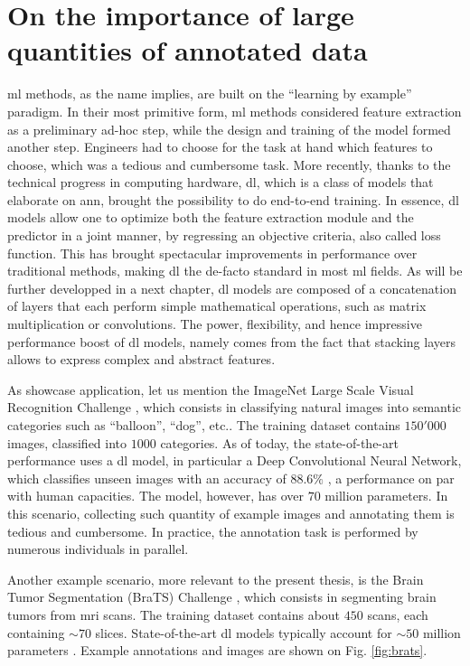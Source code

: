 \section{On the importance of large quantities of annotated data}
\Gls{ml} methods, as the name implies, are built on the ``learning by example'' paradigm.
In their most primitive form, \gls{ml} methods considered feature extraction as a preliminary ad-hoc step, while the design and training of the model formed another step.
Engineers had to choose for the task at hand which features to choose, which was a tedious and cumbersome task.
More recently, thanks to the technical progress in computing hardware, \gls{dl}, which is a class of models that elaborate on \gls{ann}, brought the possibility to do end-to-end training.
In essence, \gls{dl} models allow one to optimize both the feature extraction module and the predictor in a joint manner, by regressing an objective criteria, also called loss function.
This has brought spectacular improvements in performance over traditional methods, making \gls{dl} the de-facto standard in most \gls{ml} fields.
As will be further developped in a next chapter, \gls{dl} models are composed of a concatenation of layers that each perform simple mathematical operations, such as matrix multiplication or convolutions.
The power, flexibility, and hence impressive performance boost of \gls{dl} models, namely comes from the fact that stacking layers allows to express complex and abstract features.

As showcase application, let us mention the ImageNet Large Scale Visual Recognition Challenge \cite{ILSVRC15}, which consists in classifying natural images into semantic categories such as ``balloon'', ``dog'', etc..
The training dataset contains $150'000$ images, classified into $1000$ categories.
As of today, the state-of-the-art performance uses a \gls{dl} model, in particular a Deep Convolutional Neural Network, which classifies unseen images with an accuracy of $88.6\%$ \cite{tan19}, a performance on par with human capacities.
The model, however, has over $70$ million parameters.
In this scenario, collecting such quantity of example images and annotating them is tedious and cumbersome.
In practice, the annotation task is performed by numerous individuals in parallel.

Another example scenario, more relevant to the present thesis, is the Brain Tumor Segmentation (BraTS) Challenge \cite{menze15}, which consists in segmenting brain tumors from \gls{mri} scans.
The training dataset contains about $450$ scans, each containing $\sim 70$ slices.
State-of-the-art \gls{dl} models typically account for $\sim 50$ million parameters \cite{chen19}.
Example annotations and images are shown on Fig. \ref{fig:brats}.

